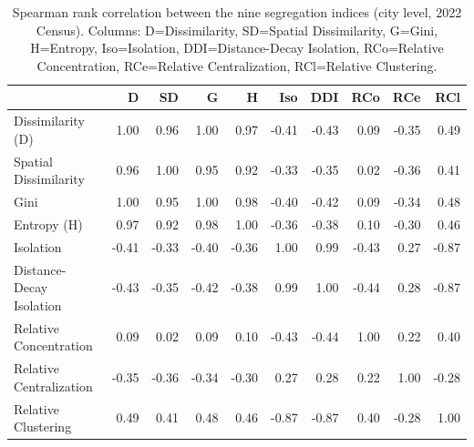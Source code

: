 \begin{table}
\caption{Spearman rank correlation between the nine segregation indices (city level, 2022 Census). Columns: D=Dissimilarity, SD=Spatial Dissimilarity, G=Gini, H=Entropy, Iso=Isolation, DDI=Distance-Decay Isolation, RCo=Relative Concentration, RCe=Relative Centralization, RCl=Relative Clustering.}
\label{tab:corr}
\begin{tabular}{lrrrrrrrrr}
\toprule
 & D & SD & G & H & Iso & DDI & RCo & RCe & RCl \\
\midrule
Dissimilarity (D) & 1.00 & 0.96 & 1.00 & 0.97 & -0.41 & -0.43 & 0.09 & -0.35 & 0.49 \\
Spatial Dissimilarity & 0.96 & 1.00 & 0.95 & 0.92 & -0.33 & -0.35 & 0.02 & -0.36 & 0.41 \\
Gini & 1.00 & 0.95 & 1.00 & 0.98 & -0.40 & -0.42 & 0.09 & -0.34 & 0.48 \\
Entropy (H) & 0.97 & 0.92 & 0.98 & 1.00 & -0.36 & -0.38 & 0.10 & -0.30 & 0.46 \\
Isolation & -0.41 & -0.33 & -0.40 & -0.36 & 1.00 & 0.99 & -0.43 & 0.27 & -0.87 \\
Distance-Decay Isolation & -0.43 & -0.35 & -0.42 & -0.38 & 0.99 & 1.00 & -0.44 & 0.28 & -0.87 \\
Relative Concentration & 0.09 & 0.02 & 0.09 & 0.10 & -0.43 & -0.44 & 1.00 & 0.22 & 0.40 \\
Relative Centralization & -0.35 & -0.36 & -0.34 & -0.30 & 0.27 & 0.28 & 0.22 & 1.00 & -0.28 \\
Relative Clustering & 0.49 & 0.41 & 0.48 & 0.46 & -0.87 & -0.87 & 0.40 & -0.28 & 1.00 \\
\bottomrule
\end{tabular}
\end{table}
